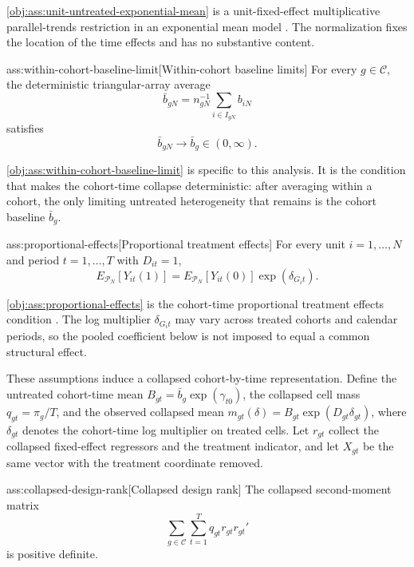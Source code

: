 \documentclass[11pt]{article}
\begin{document}
\cref{obj:ass:unit-untreated-exponential-mean} is a unit-fixed-effect multiplicative parallel-trends restriction in an exponential mean model \citep{Wooldridge2023NonlinearDiD}. The normalization fixes the location of the time effects and has no substantive content.

\begin{assumptionv}{ass:within-cohort-baseline-limit}[Within-cohort baseline limits]
For every \(g\in\mathcal C\), the deterministic triangular-array average
\[
\bar b_{gN}
=
n_{gN}^{-1}\sum_{i\in I_{gN}} b_{iN}
\]
satisfies
\[
\bar b_{gN}\to \bar b_g\in(0,\infty).
\]
\end{assumptionv}

\cref{obj:ass:within-cohort-baseline-limit} is specific to this analysis. It is the condition that makes the cohort-time collapse deterministic: after averaging within a cohort, the only limiting untreated heterogeneity that remains is the cohort baseline \(\bar b_g\).

\begin{assumptionv}{ass:proportional-effects}[Proportional treatment effects]
For every unit \(i=1,\ldots,N\) and period \(t=1,\ldots,T\) with \(D_{it}=1\),
\[
E_{\mathcal P_N}\!\left[Y_{it}(1)\right]
=
E_{\mathcal P_N}\!\left[Y_{it}(0)\right]\exp(\delta_{G_i t}).
\]
\end{assumptionv}

\cref{obj:ass:proportional-effects} is the cohort-time proportional treatment effects condition \citep{MoreauKastler2025PTT}. The log multiplier \(\delta_{G_i t}\) may vary across treated cohorts and calendar periods, so the pooled coefficient below is not imposed to equal a common structural effect.

These assumptions induce a collapsed cohort-by-time representation. Define the untreated cohort-time mean \(B_{gt}=\bar b_g\exp(\gamma_{t0})\), the collapsed cell mass \(q_{gt}=\pi_g/T\), and the observed collapsed mean \(m_{gt}(\delta)=B_{gt}\exp(D_{gt}\delta_{gt})\), where \(\delta_{gt}\) denotes the cohort-time log multiplier on treated cells. Let \(r_{gt}\) collect the collapsed fixed-effect regressors and the treatment indicator, and let \(X_{gt}\) be the same vector with the treatment coordinate removed.

\begin{assumptionv}{ass:collapsed-design-rank}[Collapsed design rank]
The collapsed second-moment matrix
\[
\sum_{g\in\mathcal C}\sum_{t=1}^T q_{gt} r_{gt} r_{gt}'
\]
is positive definite.
\end{assumptionv}
\end{document}
